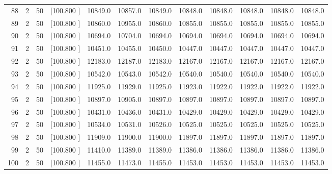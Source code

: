 \documentclass[12pt,a4paper]{article}
\begin{document}
\begin{center}
{\begin{tabular}{r r r r r r r r r r r r}
  88&  2& 50&[100.800   ]& 10849.0& 10857.0& 10849.0& 10848.0& 10848.0& 10848.0& 10848.0& 10848.0\\[-0.02in]
  89&  2& 50&[100.800   ]& 10860.0& 10955.0& 10860.0& 10855.0& 10855.0& 10855.0& 10855.0& 10855.0\\[-0.02in]
  90&  2& 50&[100.800   ]& 10694.0& 10704.0& 10694.0& 10694.0& 10694.0& 10694.0& 10694.0& 10694.0\\[-0.02in]
  91&  2& 50&[100.800   ]& 10451.0& 10455.0& 10450.0& 10447.0& 10447.0& 10447.0& 10447.0& 10447.0\\[-0.02in]
  92&  2& 50&[100.800   ]& 12183.0& 12187.0& 12183.0& 12167.0& 12167.0& 12167.0& 12167.0& 12167.0\\[-0.02in]
  93&  2& 50&[100.800   ]& 10542.0& 10543.0& 10542.0& 10540.0& 10540.0& 10540.0& 10540.0& 10540.0\\[-0.02in]
  94&  2& 50&[100.800   ]& 11925.0& 11929.0& 11925.0& 11923.0& 11922.0& 11922.0& 11922.0& 11922.0\\[-0.02in]
  95&  2& 50&[100.800   ]& 10897.0& 10905.0& 10897.0& 10897.0& 10897.0& 10897.0& 10897.0& 10897.0\\[-0.02in]
  96&  2& 50&[100.800   ]& 10431.0& 10436.0& 10431.0& 10429.0& 10429.0& 10429.0& 10429.0& 10429.0\\[-0.02in]
  97&  2& 50&[100.800   ]& 10534.0& 10531.0& 10526.0& 10525.0& 10525.0& 10525.0& 10525.0& 10525.0\\[-0.02in]
  98&  2& 50&[100.800   ]& 11909.0& 11900.0& 11900.0& 11897.0& 11897.0& 11897.0& 11897.0& 11897.0\\[-0.02in]
  99&  2& 50&[100.800   ]& 11410.0& 11389.0& 11389.0& 11386.0& 11386.0& 11386.0& 11386.0& 11386.0\\[-0.02in]
 100&  2& 50&[100.800   ]& 11455.0& 11473.0& 11455.0& 11453.0& 11453.0& 11453.0& 11453.0& 11453.0\\[-0.02in]

\hline
\end{tabular}}
\end{center}
\newpage
\end{document}
